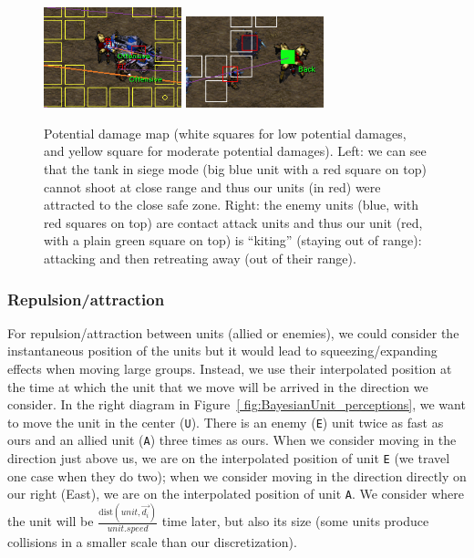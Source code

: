 \begin{figure}[h]
\begin{center}
\includegraphics[width=4cm]{images/tank_cac.png}
\hspace{1cm}
\includegraphics[width=4cm]{images/kiting.png}
\caption{Potential damage map (white squares for low potential damages, and yellow square for moderate potential damages). Left: we can see that the tank in siege mode (big blue unit with a red square on top) cannot shoot at close range and thus our units (in red) were attracted to the close safe zone. Right: the enemy units (blue, with red squares on top) are contact attack units and thus our unit (red, with a plain green square on top) is ``kiting'' (staying out of range): attacking and then retreating away (out of their range).}
\end{center}
\label{fig:potential_damage_map}
\end{figure}

\subsubsection{Repulsion/attraction}
For repulsion/attraction between units (allied or enemies), we could consider the instantaneous position of the units but it would lead to squeezing/expanding effects when moving large groups. Instead, we use their interpolated position at the time at which the unit that we move will be arrived in the direction we consider. In the right diagram in Figure~\ref{ fig:BayesianUnit_perceptions}, we want to move the unit in the center (\texttt{U}). There is an enemy (\texttt{E}) unit twice as fast as ours and an allied unit (\texttt{A}) three times as ours. When we consider moving in the direction just above us, we are on the interpolated position of unit \texttt{E} (we travel one case when they do two); when we consider moving in the direction directly on our right (East), we are on the interpolated position of unit \texttt{A}. 
We consider where the unit will be $\frac{\mathrm{dist}(unit, \vec{d_i})}{unit.speed}$ time later, but also its size (some units produce collisions in a smaller scale than our discretization).

